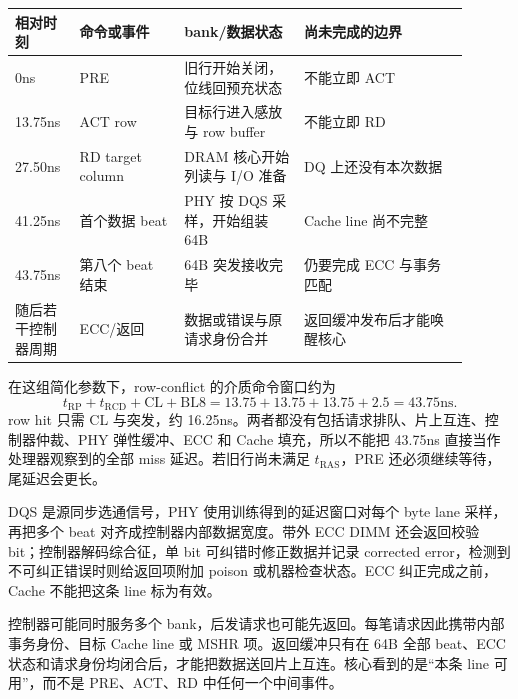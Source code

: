 \begin{longtable}{L{0.12\linewidth}L{0.21\linewidth}L{0.24\linewidth}L{0.33\linewidth}}
\toprule
相对时刻 & 命令或事件 & bank/数据状态 & 尚未完成的边界 \\
\midrule
0ns & PRE & 旧行开始关闭，位线回预充状态 & 不能立即 ACT \\\tablerowrule
13.75ns & ACT row  & 目标行进入感放与 row buffer & 不能立即 RD \\\tablerowrule
27.50ns & RD target column & DRAM 核心开始列读与 I/O 准备 & DQ 上还没有本次数据 \\\tablerowrule
41.25ns & 首个数据 beat & PHY 按 DQS 采样，开始组装 64B & Cache line 尚不完整 \\\tablerowrule
43.75ns & 第八个 beat 结束 & 64B 突发接收完毕 & 仍要完成 ECC 与事务匹配 \\\tablerowrule
随后若干控制器周期 & ECC/返回 & 数据或错误与原请求身份合并 & 返回缓冲发布后才能唤醒核心 \\
\bottomrule
\end{longtable}

在这组简化参数下，row-conflict 的介质命令窗口约为
\[
 t_{\mathrm{RP}}+t_{\mathrm{RCD}}+\mathrm{CL}+\mathrm{BL8}
 =13.75+13.75+13.75+2.5=43.75\mathrm{ns}.
\]
row hit 只需 CL 与突发，约 16.25ns。两者都没有包括请求排队、片上互连、控制器仲裁、PHY 弹性缓冲、ECC 和 Cache 填充，所以不能把 43.75ns 直接当作处理器观察到的全部 miss 延迟。若旧行尚未满足 $t_{\mathrm{RAS}}$，PRE 还必须继续等待，尾延迟会更长。


DQS 是源同步选通信号，PHY 使用训练得到的延迟窗口对每个 byte lane 采样，再把多个 beat 对齐成控制器内部数据宽度。带外 ECC DIMM 还会返回校验 bit；控制器解码综合征，单 bit 可纠错时修正数据并记录 corrected error，检测到不可纠正错误时则给返回项附加 poison 或机器检查状态。ECC 纠正完成之前，Cache 不能把这条 line 标为有效。

控制器可能同时服务多个 bank，后发请求也可能先返回。每笔请求因此携带内部事务身份、目标 Cache line 或 MSHR 项。返回缓冲只有在 64B 全部 beat、ECC 状态和请求身份均闭合后，才能把数据送回片上互连。核心看到的是“本条 line 可用”，而不是 PRE、ACT、RD 中任何一个中间事件。

